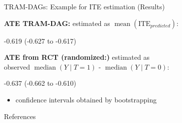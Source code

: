 \documentclass[onlytextwidth,english]{beamer}\usepackage[]{graphicx}\usepackage[]{xcolor}
\begin{document}
\begin{frame}{TRAM-DAGs: Example for ITE estimation (Results)}





\textbf{ATE TRAM-DAG:} estimated as $\operatorname{mean}(\text{ITE}_{predicted})$:


-0.619 (-0.627 to -0.617)

\vspace{1em}

\textbf{ATE from RCT (randomized:)} estimated as \\ 
observed $\operatorname{median}(Y \mid T = 1)$ - $\operatorname{median}(Y \mid T = 0)$:

-0.637 (-0.662 to -0.610)


\vspace{1em}

\begin{itemize}
    \item confidence intervals obtained by bootstrapping
\end{itemize}






\end{frame}



\begin{frame}{References}
  \small
  

\end{frame}
\end{document}
